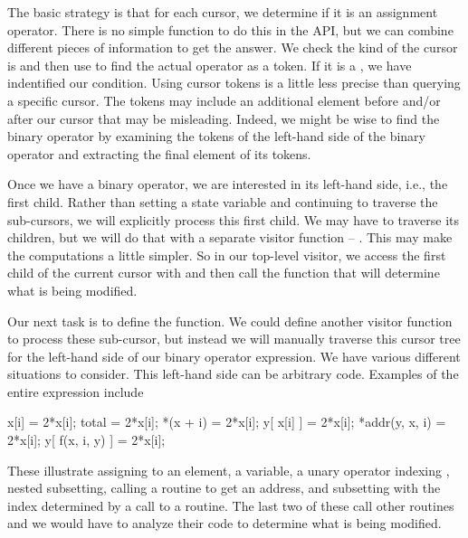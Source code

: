 The basic strategy is that for each cursor, we determine if it is an
assignment operator. There is no simple function to do this in the
\libclang{} API, but we can combine different pieces of information to
get the answer. We check the kind of the cursor is
 and then use  to
find the actual operator as a token.  If it is a \dquote{=}, we have
indentified our condition.  Using cursor tokens is a little less
precise than querying a specific cursor. The tokens may include an
additional element before and/or after our cursor that may be
misleading.  Indeed, we might be wise to find the binary operator by
examining the tokens of the left-hand side of the binary operator and
extracting the final element of its tokens.

Once we have a binary operator, we are interested in its left-hand
side, i.e., the first child.  Rather than setting a state variable and
continuing to traverse the sub-cursors, we will explicitly process
this first child. We may have to traverse its children, but we will do
that with a separate visitor function -- .  This may
make the computations a little simpler.  So in our top-level visitor,
we access the first child of the current cursor with 
and  then call the function that will determine what is being modified.

Our next task is to define the  function.  We could
define another visitor function to process these sub-cursor, but
instead we will manually traverse this cursor tree for the left-hand
side of our binary operator expression.  We have various different
situations to consider.  This left-hand side can be arbitrary \C{}
code. Examples of the entire expression include
\begin{CCode}
x[i] = 2*x[i];
total = 2*x[i];
*(x + i) = 2*x[i];  
y[ x[i] ] = 2*x[i];
*addr(y, x, i) = 2*x[i];
y[ f(x, i, y) ] = 2*x[i];
\end{CCode}
These illustrate assigning to an element, a variable,
a unary operator indexing , nested subsetting, 
calling a routine to get an address, and subsetting
with the index determined by a call to a routine.
The last two of these call other routines and we would have
to analyze their code to determine what is being modified.

